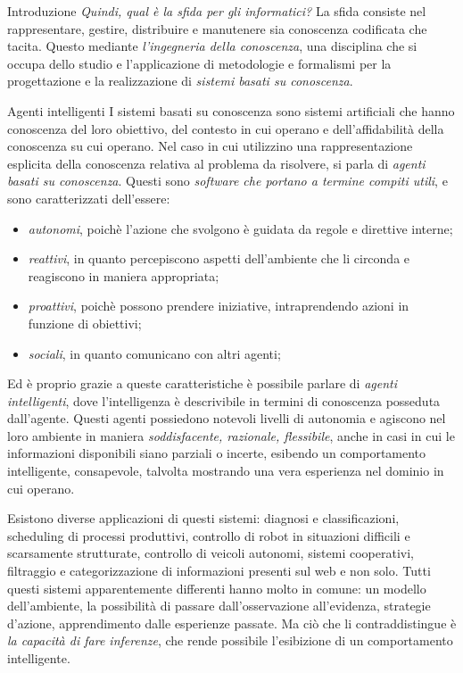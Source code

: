 \begin{chapter}{Introduzione}
\textit {Quindi, qual \`e la sfida per gli informatici?} La sfida consiste nel rappresentare, gestire, 
distribuire e manutenere sia conoscenza codificata che tacita. Questo mediante \textit {l'ingegneria della conoscenza}, 
una disciplina che si occupa dello studio e l'applicazione di metodologie e formalismi per la progettazione e la
realizzazione di \textit {sistemi basati su conoscenza}. 

\begin{section}{Agenti intelligenti}
I sistemi basati su conoscenza sono sistemi artificiali che hanno conoscenza 
del loro obiettivo, del contesto in cui operano e dell'affidabilit\`a della conoscenza su cui operano.
Nel caso in cui utilizzino una rappresentazione esplicita della conoscenza relativa al problema da risolvere,
si parla di \textit{agenti basati su conoscenza}. Questi sono \textit {software che portano a
termine compiti utili}, e sono caratterizzati dell'essere:
\begin{itemize}
    \item \textit {autonomi}, poich\`e l'azione che svolgono \`e guidata da regole e direttive interne;
    \item \textit {reattivi}, in quanto percepiscono aspetti dell'ambiente che li circonda e reagiscono in maniera appropriata;
    \item \textit {proattivi}, poich\`e possono prendere iniziative, intraprendendo azioni in funzione di obiettivi;
    \item \textit {sociali}, in quanto comunicano con altri agenti;
\end{itemize}
Ed \`e proprio grazie a queste caratteristiche \`e possibile parlare di \textit {agenti intelligenti},
dove l'intelligenza \`e descrivibile in termini di conoscenza posseduta dall'agente.
Questi agenti possiedono notevoli livelli di autonomia e agiscono nel loro ambiente in
maniera \textit{soddisfacente, razionale, flessibile}, anche in casi in cui le informazioni
disponibili siano parziali o incerte, esibendo un comportamento intelligente, consapevole, talvolta mostrando
una vera esperienza nel dominio in cui operano.

Esistono diverse applicazioni di questi sistemi: diagnosi e classificazioni, scheduling
di processi produttivi, controllo di robot in situazioni difficili e scarsamente strutturate,
controllo di veicoli autonomi, sistemi cooperativi, filtraggio e categorizzazione di
informazioni presenti sul web e non solo. Tutti questi sistemi apparentemente differenti
hanno molto in comune: un modello dell'ambiente, la possibilit\`a di passare
dall'osservazione all'evidenza, strategie d'azione, apprendimento dalle esperienze passate.
Ma ci\`o che li contraddistingue \`e \textit{la capacit\`a di fare inferenze}, che rende
possibile l'esibizione di un comportamento intelligente. 


\end{section}
\end{chapter}

